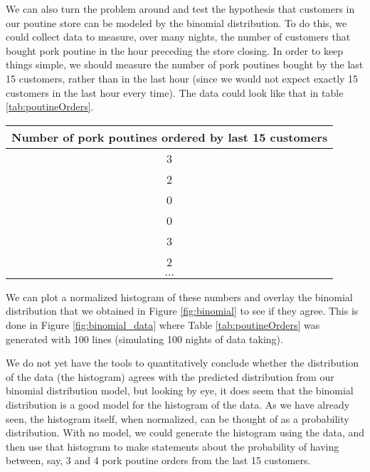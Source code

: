 
We can also turn the problem around and test the hypothesis that customers in our poutine store can be modeled by the binomial distribution. To do this, we could collect data to measure, over many nights, the number of customers that bought pork poutine in the hour preceding the store closing. In order to keep things simple, we should measure the number of pork poutines bought by the last 15 customers, rather than in the last hour (since we would not expect exactly 15 customers in the last hour every time). The data could look like that in table \ref{tab:poutineOrders}.
\begin{center}
\center
\begin{tabular}{|c|}
\hline \textbf{Number of pork poutines ordered by last 15 customers} \\
\hline
3\\
\hline
2\\
\hline
0\\
\hline
0\\
\hline
3\\
\hline
2\\
\hline
 $\dots$ \\
 \hline
\end{tabular}
\end{center} 

We can plot a normalized histogram of these numbers and overlay the binomial distribution that we obtained in Figure \ref{fig:binomial} to see if they agree. This is done in Figure \ref{fig:binomial_data} where Table \ref{tab:poutineOrders} was generated with 100 lines (simulating 100 nights of data taking).


We do not yet have the tools to quantitatively conclude whether the distribution of the data (the histogram) agrees with the predicted distribution from our binomial distribution model, but looking by eye, it does seem that the binomial distribution is a good model for the histogram of the data. As we have already seen, the histogram itself, when normalized, can be thought of as a probability distribution. With no model, we could generate the histogram using the data, and then use that histogram to make statements about the probability of having between, say, 3 and 4 pork poutine orders from the last 15 customers. 

